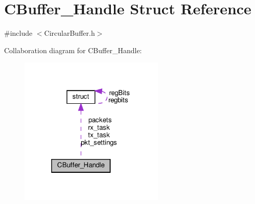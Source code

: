 \hypertarget{structCBuffer__Handle}{}\section{C\+Buffer\+\_\+\+Handle Struct Reference}
\label{structCBuffer__Handle}


{\ttfamily \#include $<$Circular\+Buffer.\+h$>$}



Collaboration diagram for C\+Buffer\+\_\+\+Handle\+:\nopagebreak
\begin{figure}[H]
\begin{center}
\leavevmode
\includegraphics[width=196pt]{structCBuffer__Handle__coll__graph}
\end{center}
\end{figure}
